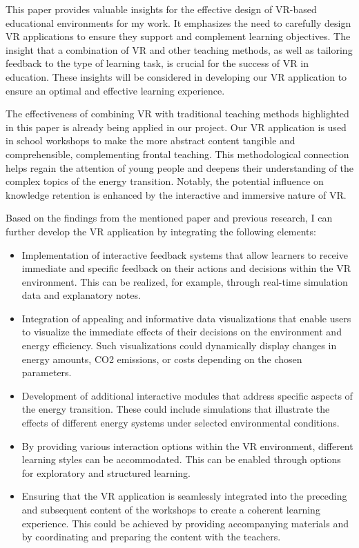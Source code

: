 \documentclass[draft, final]{vutinfth} %
\begin{document}
This paper provides valuable insights for the effective design of VR-based educational environments for my work. It emphasizes the need to carefully design VR applications to ensure they support and complement learning objectives. The insight that a combination of VR and other teaching methods, as well as tailoring feedback to the type of learning task, is crucial for the success of VR in education. These insights will be considered in developing our VR application to ensure an optimal and effective learning experience.

The effectiveness of combining VR with traditional teaching methods highlighted in this paper is already being applied in our project. Our VR application is used in school workshops to make the more abstract content tangible and comprehensible, complementing frontal teaching. This methodological connection helps regain the attention of young people and deepens their understanding of the complex topics of the energy transition. Notably, the potential influence on knowledge retention is enhanced by the interactive and immersive nature of VR.

Based on the findings from the mentioned paper and previous research, I can further develop the VR application by integrating the following elements:

\begin{itemize}
  \item Implementation of interactive feedback systems that allow learners to receive immediate and specific feedback on their actions and decisions within the VR environment. This can be realized, for example, through real-time simulation data and explanatory notes.

  \item Integration of appealing and informative data visualizations that enable users to visualize the immediate effects of their decisions on the environment and energy efficiency. Such visualizations could dynamically display changes in energy amounts, CO2 emissions, or costs depending on the chosen parameters.

  \item Development of additional interactive modules that address specific aspects of the energy transition. These could include simulations that illustrate the effects of different energy systems under selected environmental conditions.

  \item By providing various interaction options within the VR environment, different learning styles can be accommodated. This can be enabled through options for exploratory and structured learning.

  \item Ensuring that the VR application is seamlessly integrated into the preceding and subsequent content of the workshops to create a coherent learning experience. This could be achieved by providing accompanying materials and by coordinating and preparing the content with the teachers.

\end{itemize}
\end{document}
